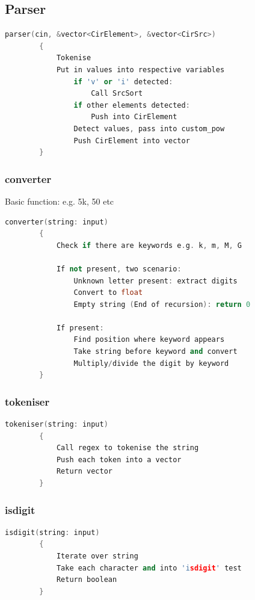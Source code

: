 \documentclass[a4paper, titlepage]{article}
\begin{document}
    \subsection{Parser}
    \begin{lstlisting}[language=C++]
        parser(cin, &vector<CirElement>, &vector<CirSrc>)
        {
            Tokenise
            Put in values into respective variables
                if 'v' or 'i' detected:
                    Call SrcSort
                if other elements detected:
                    Push into CirElement
                Detect values, pass into custom_pow
                Push CirElement into vector
        }
    \end{lstlisting}
    \subsubsection{converter}
    Basic function: e.g. 5k, 50 etc
    \begin{lstlisting}[language=C++]
        converter(string: input)
        {
            Check if there are keywords e.g. k, m, M, G
    
            If not present, two scenario:
                Unknown letter present: extract digits 
                Convert to float
                Empty string (End of recursion): return 0
    
            If present:
                Find position where keyword appears
                Take string before keyword and convert
                Multiply/divide the digit by keyword
        }
    \end{lstlisting}

    \subsubsection{tokeniser}
    \begin{lstlisting}[language=C++]
        tokeniser(string: input)
        {
            Call regex to tokenise the string 
            Push each token into a vector 
            Return vector
        }
    \end{lstlisting}

    \subsubsection{isdigit}
    \begin{lstlisting}[language=C++]
        isdigit(string: input)
        {
            Iterate over string
            Take each character and into 'isdigit' test
            Return boolean
        }
    \end{lstlisting}
\end{document}
